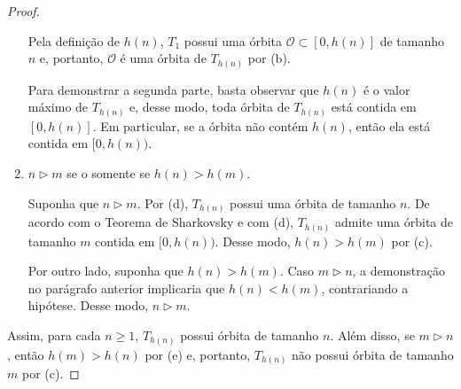 \begin{proof}
\begin{enumerate}[label = (\alph*)]
Pela definição de $h(n)$, $T_1$ possui uma órbita $\mathcal{O} \subset [0, h(n)]$ de tamanho $n$ e, portanto, $\mathcal{O}$ é uma órbita de $T_{h(n)}$ por (b).

Para demonstrar a segunda parte, basta observar que $h(n)$ é o valor máximo de $T_{h(n)}$ e, desse modo, toda órbita de $T_{h(n)}$ está contida em $[0, h(n)]$. Em particular, se a órbita não contém $h(n)$, então ela está contida em $[0, h(n))$.

\item $n \triangleright m$ se o somente se $h(n) > h(m)$.

Suponha que $n \triangleright m$. Por (d), $T_{h(n)}$ possui uma órbita de tamanho $n$. De acordo com o Teorema de Sharkovsky e com (d), $T_{h(n)}$ admite uma órbita de tamanho $m$ contida em $[0, h(n))$. Desse modo,  $h(n) > h(m)$ por (c).

Por outro lado, suponha que $h(n) > h(m)$. Caso $m \triangleright n$, a demonstração no parágrafo anterior implicaria que $h(n) < h(m)$, contrariando a hipótese. Desse modo, $n \triangleright m$.
\end{enumerate}

Assim, para cada $n \geq 1$, $T_{h(n)}$ possui órbita de tamanho $n$. Além disso, se $m \triangleright n$, então $h(m) > h(n)$ por (e) e, portanto, $T_{h(n)}$ não possui órbita de tamanho $m$ por (c).
\end{proof}